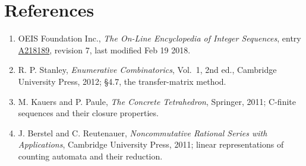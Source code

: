 \documentclass[11pt]{article}
\theoremstyle{definition}
\begin{document}
\section{References}

\begin{enumerate}

\item OEIS Foundation Inc., \emph{The On-Line Encyclopedia of Integer Sequences}, entry \href{https://oeis.org/A218189}{A218189}, revision 7, last modified Feb 19 2018.

\item R. P. Stanley, \emph{Enumerative Combinatorics}, Vol.~1, 2nd ed., Cambridge University Press, 2012; \S4.7, the transfer-matrix method.

\item M. Kauers and P. Paule, \emph{The Concrete Tetrahedron}, Springer, 2011; C-finite sequences and their closure properties.

\item J. Berstel and C. Reutenauer, \emph{Noncommutative Rational Series with Applications}, Cambridge University Press, 2011; linear representations of counting automata and their reduction.

\end{enumerate}
\end{document}
